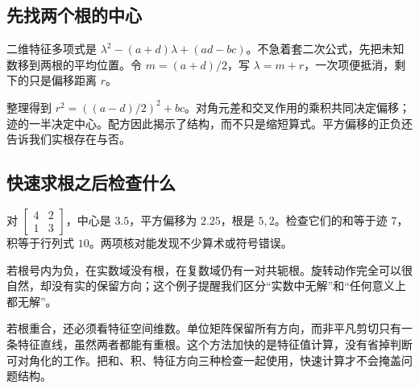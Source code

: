 \subsection*{先找两个根的中心}
二维特征多项式是 $\lambda^2-(a+d)\lambda+(ad-bc)$。不急着套二次公式，先把未知数移到两根的平均位置。令 $m=(a+d)/2$，写 $\lambda=m+r$，一次项便抵消，剩下的只是偏移距离 $r$。

整理得到 $r^2=((a-d)/2)^2+bc$。对角元差和交叉作用的乘积共同决定偏移；迹的一半决定中心。配方因此揭示了结构，而不只是缩短算式。平方偏移的正负还告诉我们实根存在与否。

\subsection*{快速求根之后检查什么}
对 $\left[\begin{smallmatrix}4&2\\1&3\end{smallmatrix}\right]$，中心是 $3.5$，平方偏移为 $2.25$，根是 $5,2$。检查它们的和等于迹 $7$，积等于行列式 $10$。两项核对能发现不少算术或符号错误。

若根号内为负，在实数域没有根，在复数域仍有一对共轭根。旋转动作完全可以很自然，却没有实的保留方向；这个例子提醒我们区分“实数中无解”和“任何意义上都无解”。

若根重合，还必须看特征空间维数。单位矩阵保留所有方向，而非平凡剪切只有一条特征直线，虽然两者都能有重根。这个方法加快的是特征值计算，没有省掉判断可对角化的工作。把和、积、特征方向三种检查一起使用，快速计算才不会掩盖问题结构。
